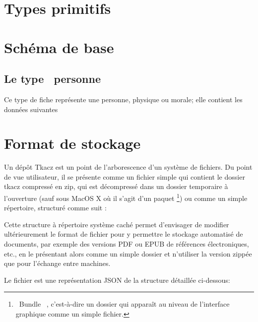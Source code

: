 \documentclass[11pt,french]{article}
\makeatletter
\providecommand{\og}{\leavevmode\flqq~}%
\providecommand{\fg}{\ifdim\lastskip>\z@\unskip\fi~\frqq}%
\makeatother
\begin{document}
\section{Types primitifs}


\section{Schéma de base\label{sec:CoreSchema}}


\subsection{Le type \og personne \fg{}}

Ce type de fiche représente une personne, physique ou morale; elle
contient les données suivantes


\section{Format de stockage}

Un dépôt Tkacz est un point de l'arborescence d'un système de fichiers.
Du point de vue utilisateur, il se présente comme un fichier simple
qui contient le dossier tkacz compressé en zip, qui est décompressé
dans un dossier temporaire à l'ouverture (sauf sous MacOS X où il
s'agit d'un paquet%
\footnote{\og Bundle \fg{}, c'est-à-dire un dossier qui apparaît au niveau
de l'interface graphique comme un simple fichier.%
}) ou comme un simple répertoire, structuré comme suit :

\begin{table}[H]
\end{table}


Cette structure à répertoire système caché permet d'envisager de modifier
ultérieurement le format de fichier pour y permettre le stockage automatisé
de documents, par exemple des versions PDF ou EPUB de références électroniques,
etc., en le présentant alors comme un simple dossier et n'utiliser
la version zippée que pour l'échange entre machines.

Le fichier  est une représentation JSON
de la structure détaillée ci-dessous:
\end{document}
